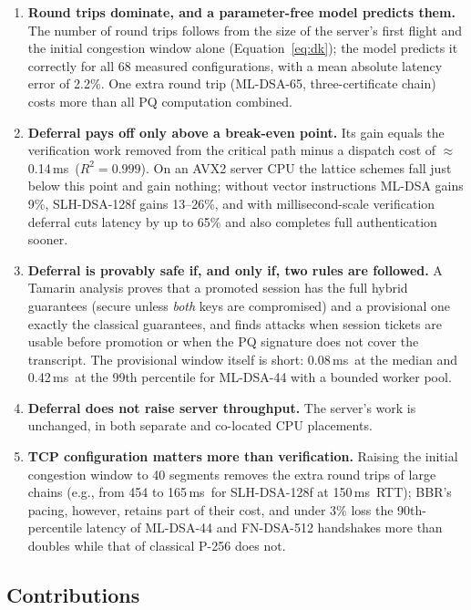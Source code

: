 \documentclass[preprint,10pt,3p]{elsarticle}
\newcommand{\ms}{\,ms}
\begin{document}
\begin{enumerate}[label=\textbf{F\arabic*}, leftmargin=2.2em]
\item \textbf{Round trips dominate, and a parameter-free model predicts
  them.}  The number of round trips follows from the size of the server's
  first flight and the initial congestion window alone
  (Equation~\eqref{eq:dk}); the model predicts it correctly for all
  68 measured configurations, with a mean absolute latency error of
  2.2\%.  One extra round trip (ML-DSA-65, three-certificate chain)
  costs more than all PQ computation combined.
\item \textbf{Deferral pays off only above a break-even point.}  Its gain
  equals the verification work removed from the critical path minus a
  dispatch cost of $\approx$0.14\ms\ ($R^2 = 0.999$).  On an AVX2 server
  CPU the lattice schemes fall just below this point and gain nothing;
  without vector instructions ML-DSA gains 9\%, SLH-DSA-128f gains
  13--26\%, and with millisecond-scale verification deferral cuts latency
  by up to 65\% and also completes full authentication sooner.
\item \textbf{Deferral is provably safe if, and only if, two rules are
  followed.}  A Tamarin analysis proves that a promoted session has the
  full hybrid guarantees (secure unless \emph{both} keys are compromised)
  and a provisional one exactly the classical guarantees, and finds attacks
  when session tickets are usable before promotion or when the PQ
  signature does not cover the transcript.  The provisional window itself
  is short: 0.08\ms\ at the median and 0.42\ms\ at the 99th percentile
  for ML-DSA-44 with a bounded worker pool.
\item \textbf{Deferral does not raise server throughput.}  The server's
  work is unchanged, in both separate and co-located CPU placements.
\item \textbf{TCP configuration matters more than verification.}  Raising
  the initial congestion window to 40 segments removes the extra round
  trips of large chains (e.g., from 454 to 165\ms\ for SLH-DSA-128f at 150\ms\ RTT); BBR's pacing, however, retains part
  of their cost, and under 3\% loss the 90th-percentile latency of
  ML-DSA-44 and FN-DSA-512 handshakes more than doubles while that of
  classical P-256 does not.
\end{enumerate}

\subsection{Contributions}
\end{document}
